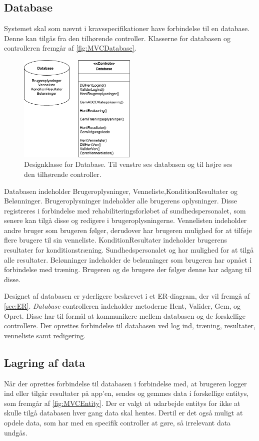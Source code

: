 \subsection*{Database}
Systemet skal som nævnt i kravsspecifikationer have forbindelse til en database. Denne kan tilgås fra den tilhørende controller. Klasserne for databasen og controlleren fremgår af \autoref{fig:MVCDatabase}. 

\begin{figure} [H]
\centering
\includegraphics[width=0.5\textwidth]{figures/MVC/MVCDatabase}
\caption{Designklasse for Database. Til venstre ses databasen og til højre ses den tilhørende controller.}
\label{fig:MVCDatabase}
\end{figure}

\noindent
Databasen indeholder Brugeroplysninger, Venneliste,KonditionResultater og Belønninger. Brugeroplysninger indeholder alle brugerens oplysninger. Disse registreres i forbindelse med rehabiliteringsforløbet af sundhedspersonalet, som senere kan tilgå disse og redigere i brugeroplysningerne. Vennelisten indeholder andre bruger som brugeren følger, derudover har brugeren mulighed for at tilføje flere brugere til sin venneliste. KonditionResultater indeholder brugerens resultater for konditionstræning. Sundhedspersonalet og har mulighed for at tilgå alle resultater. Belønninger indeholder de belønninger som brugeren har opnået i forbindelse med træning. Brugeren og de brugere der følger denne har adgang til disse.  

Designet af databasen er yderligere beskrevet i et ER-diagram, der vil fremgå af \autoref{sec:ER}. \textit{Database} controlleren indeholder metoderne Hent, Valider, Gem, og Opret. Disse har til formål at kommunikere mellem databasen og de forskellige controllere. Der oprettes forbindelse til databasen ved log ind, træning, resultater, venneliste samt redigering. 

\subsection*{Lagring af data}  \label{sec:entity}
Når der oprettes forbindelse til databasen i forbindelse med, at brugeren logger ind eller tilgår resultater på app'en, sendes og gemmes data i forskellige entitys, som fremgår af \autoref{fig:MVCEntity}. Der er valgt at udarbejde entitys for ikke at skulle tilgå databasen hver gang data skal hentes. Dertil er det også muligt at opdele data, som har med en specifik controller at gøre, så irrelevant data undgås. 

